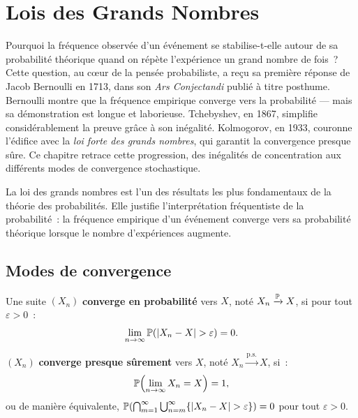 \chapter{Lois des Grands Nombres}
\label{ch:grands_nombres}

Pourquoi la fr\'equence observ\'ee d'un \'ev\'enement se stabilise-t-elle autour de sa probabilit\'e th\'eorique quand on r\'ep\`ete l'exp\'erience un grand nombre de fois~? Cette question, au c\oe ur de la pens\'ee probabiliste, a re\c{c}u sa premi\`ere r\'eponse de Jacob Bernoulli en 1713, dans son \emph{Ars Conjectandi} publi\'e \`a titre posthume. Bernoulli montre que la fr\'equence empirique converge vers la probabilit\'e --- mais sa d\'emonstration est longue et laborieuse. Tchebyshev, en 1867, simplifie consid\'erablement la preuve gr\^ace \`a son in\'egalit\'e. Kolmogorov, en 1933, couronne l'\'edifice avec la \emph{loi forte des grands nombres}, qui garantit la convergence presque s\^ure. Ce chapitre retrace cette progression, des in\'egalit\'es de concentration aux diff\'erents modes de convergence stochastique.

\begin{intuition}
La loi des grands nombres est l'un des r\'esultats les plus fondamentaux de la
th\'eorie des probabilit\'es. Elle justifie l'interpr\'etation fr\'equentiste de
la probabilit\'e~: la fr\'equence empirique d'un \'ev\'enement converge vers sa
probabilit\'e th\'eorique lorsque le nombre d'exp\'eriences augmente.
\end{intuition}

\section{Modes de convergence}

\begin{definition}
Une suite $(X_n)$ \textbf{converge en probabilit\'e} vers $X$, not\'e
$X_n \xrightarrow{\mathbb{P}} X$, si pour tout $\varepsilon > 0$~:
\[
    \lim_{n \to \infty} \mathbb{P}(\left| X_n - X \right| > \varepsilon) = 0.
\]
\end{definition}

\begin{definition}
$(X_n)$ \textbf{converge presque s\^urement} vers $X$, not\'e
$X_n \xrightarrow{\text{p.s.}} X$, si~:
\[
    \mathbb{P}\!\left(\lim_{n \to \infty} X_n = X\right) = 1,
\]
ou de mani\`ere \'equivalente, $\mathbb{P}\!\left(\bigcap_{m=1}^{\infty}
\bigcup_{n=m}^{\infty} \{\left| X_n - X \right| > \varepsilon\}\right) = 0$
pour tout $\varepsilon > 0$.
\end{definition}

